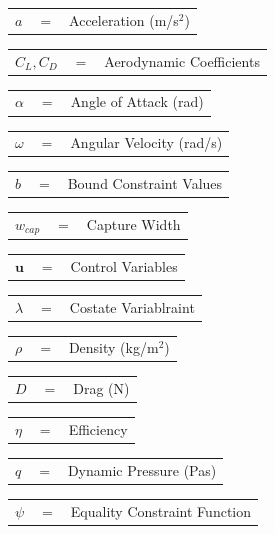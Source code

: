 \noindent
\begin{tabular}{p{0.8cm}p{0.8cm}p{5.6cm}}
	$a$ & $=$ & Acceleration (m/s$^2$)\\
\end{tabular} 
\begin{tabular}{p{0.8cm}p{0.8cm}p{5.6cm}}
	$C_L,C_D$ & $=$ & Aerodynamic Coefficients\\
\end{tabular} 
\begin{tabular}{p{0.8cm}p{0.8cm}p{5.6cm}}
	$\alpha$ & $=$ & Angle of Attack (rad)\\
\end{tabular} 
\begin{tabular}{p{0.8cm}p{0.8cm}p{5.6cm}}
	$\omega$ & $=$ & Angular Velocity (rad/s)\\
\end{tabular} 
\begin{tabular}{p{0.8cm}p{0.8cm}p{5.6cm}}
	$b$ & $=$ & Bound Constraint Values\\
\end{tabular}
\begin{tabular}{p{0.8cm}p{0.8cm}p{5.6cm}}
	$w_{cap}$ & $=$ & Capture Width\\
\end{tabular} 
\begin{tabular}{p{0.8cm}p{0.8cm}p{5.6cm}}
	$\textbf{u}$& $=$ & Control Variables\\
\end{tabular} 
\begin{tabular}{p{0.8cm}p{0.8cm}p{5.6cm}}
	$\lambda$ & $=$ & Costate Variablraint 
\end{tabular}
\begin{tabular}{p{0.8cm}p{0.8cm}p{5.6cm}}
	$\rho$ & $=$ & Density (kg/m$^2$)\\
\end{tabular} 
\begin{tabular}{p{0.8cm}p{0.8cm}p{5.6cm}}
	$D$ & $=$ & Drag (N)\\
\end{tabular} 
\begin{tabular}{p{0.8cm}p{0.8cm}p{5.6cm}}
	$\eta$ & $=$ & Efficiency\\
\end{tabular} 
\begin{tabular}{p{0.8cm}p{0.8cm}p{5.6cm}}
	$q$ & $=$ & Dynamic Pressure (Pas)\\  
\end{tabular}     
\begin{tabular}{p{0.8cm}p{0.8cm}p{5.6cm}}
	$\psi$ & $=$ & Equality Constraint Function\\
\end{tabular}
